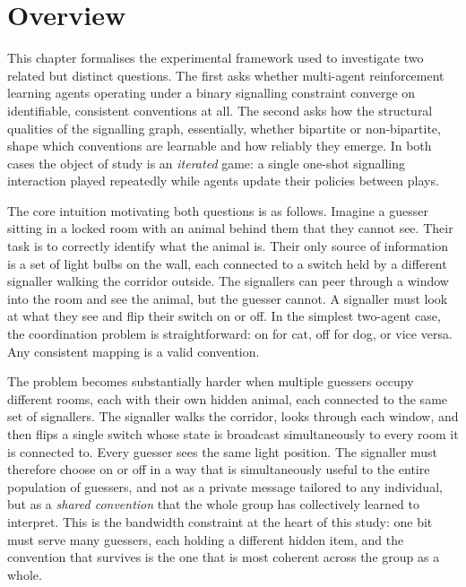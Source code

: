 \documentclass[a4paper,twoside,12pt]{report}
\begin{document}
    
    \section{Overview}
    
    This chapter formalises the experimental framework used to investigate two
    related but distinct questions. The first asks whether multi-agent reinforcement
    learning agents operating under a binary signalling constraint converge on
    identifiable, consistent conventions at all. The second asks how the structural
    qualities of the signalling graph, essentially, whether bipartite or non-bipartite, shape which conventions are learnable and how reliably they emerge.  In both cases the object of study is an \emph{iterated} game: a single
    one-shot signalling interaction played repeatedly while agents update their
    policies between plays.
    
    The core intuition motivating both questions is as follows. Imagine a guesser
    sitting in a locked room with an animal behind them that they cannot see. Their
    task is to correctly identify what the animal is. Their only source of
    information is a set of light bulbs on the wall, each connected to a switch
    held by a different signaller walking the corridor outside. The signallers can
    peer through a window into the room and see the animal, but the guesser
    cannot. A signaller must look at what they see and flip their switch on or off.
    In the simplest two-agent case, the coordination problem is straightforward: on
    for cat, off for dog, or vice versa. Any consistent mapping is a valid
    convention.
    
    The problem becomes substantially harder when multiple guessers occupy
    different rooms, each with their own hidden animal, each connected to the same
    set of signallers. The signaller walks the corridor, looks through each window,
    and then flips a single switch whose state is broadcast simultaneously to every
    room it is connected to. Every guesser sees the same light position. The
    signaller must therefore choose on or off in a way that is simultaneously useful
    to the entire population of guessers, and not as a private message tailored to
    any individual, but as a \emph{shared convention} that the whole group has
    collectively learned to interpret. This is the bandwidth constraint at the heart
    of this study: one bit must serve many guessers, each holding a different hidden
    item, and the convention that survives is the one that is most coherent across
    the group as a whole.
    
\end{document}
